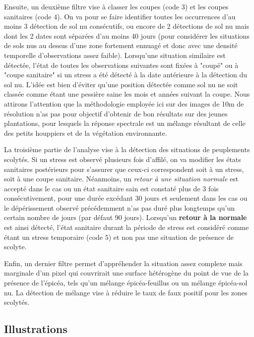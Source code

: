 \documentclass[a4paper, 12pt]{article} %
\begin{document}
Ensuite, un deuxième filtre vise à classer les coupes (code 3) et les coupes sanitaires (code 4). On va pour se faire identifier toutes les occurrences d'au moins 3 détection de sol nu consécutifs, ou encore de 2 détections de sol nu mais dont les 2 dates sont séparées d'au moins 40 jours (pour considérer les situations de sols nus au dessus d'une zone fortement ennuagé et donc avec une densité temporelle d'observations assez faible). Lorsqu'une situation similaire est détectée, l'état de toutes les observations suivantes sont fixées à "coupé" ou à "coupe sanitaire" si un stress a été détecté à la date antérieure à la détection du sol nu. L'idée est bien d'éviter qu'une position détectée comme sol nu ne soit classée comme étant une pessière saine les mois et années suivant la coupe. Nous attirons l'attention que la méthodologie employée ici sur des images de 10m de résolution n'as pas pour objectif d'obtenir de bon résultats sur des jeunes plantations, pour lesquels la réponse spectrale est un mélange résultant de celle des petits houppiers et de la végétation environnante.

La troisième partie de l'analyse vise à la détection des situations de peuplements scolytés. Si un stress est observé plusieurs fois d'affilé, on va modifier les états sanitaires postérieurs pour s'assurer que ceux-ci correspondent soit à un stress, soit à une coupe sanitaire. Néanmoins, un \textit{retour à une situation normale} est accepté dans le cas ou un état sanitaire sain est constaté plus de 3 fois consécutivement, pour une durée excédant 30 jours et seulement dans les cas ou le dépérissement observé précédemment n'as pas duré plus longtemps qu'un certain nombre de jours (par défaut 90 jours). Lorsqu'un \textbf{retour à la normale} est ainsi détecté, l'état sanitaire durant la période de stress est considéré comme étant un stress temporaire (code 5) et non pas une situation de présence de scolyte.

Enfin, un dernier filtre permet d'appréhender la situation assez complexe mais marginale d'un pixel qui couvrirait une surface hétérogène du point de vue de la présence de l'épicéa, tels qu'un mélange épicéa-feuillus ou un mélange épicéa-sol nu. La détection de mélange vise à réduire le taux de faux positif pour les zones scolytés.

\subsection{Illustrations}
\end{document}

